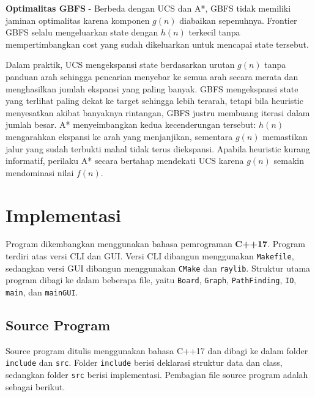 \documentclass[a4paper,11pt]{article}
\begin{document}
\textbf{Optimalitas GBFS} - Berbeda dengan UCS dan A*, GBFS tidak memiliki jaminan optimalitas karena komponen $g(n)$ diabaikan sepenuhnya. Frontier GBFS selalu mengeluarkan state dengan $h(n)$ terkecil tanpa mempertimbangkan cost yang sudah dikeluarkan untuk mencapai state tersebut.

Dalam praktik, UCS mengekspansi state berdasarkan urutan $g(n)$ tanpa panduan arah sehingga pencarian menyebar ke semua arah secara merata dan menghasilkan jumlah ekspansi yang paling banyak. GBFS mengekspansi state yang terlihat paling dekat ke target sehingga lebih terarah, tetapi bila heuristic menyesatkan akibat banyaknya rintangan, GBFS justru membuang iterasi dalam jumlah besar. A* menyeimbangkan kedua kecenderungan tersebut: $h(n)$ mengarahkan ekspansi ke arah yang menjanjikan, sementara $g(n)$ memastikan jalur yang sudah terbukti mahal tidak terus diekspansi. Apabila heuristic kurang informatif, perilaku A* secara bertahap mendekati UCS karena $g(n)$ semakin mendominasi nilai $f(n)$.

\section{Implementasi}
Program dikembangkan menggunakan bahasa pemrograman \textbf{C++17}. Program terdiri atas versi CLI dan GUI. Versi CLI dibangun menggunakan \texttt{Makefile}, sedangkan versi GUI dibangun menggunakan \texttt{CMake} dan \texttt{raylib}. Struktur utama program dibagi ke dalam beberapa file, yaitu \texttt{Board}, \texttt{Graph}, \texttt{PathFinding}, \texttt{IO}, \texttt{main}, dan \texttt{mainGUI}.

\subsection{Source Program}
Source program ditulis menggunakan bahasa C++17 dan dibagi ke dalam folder \texttt{include} dan \texttt{src}. Folder \texttt{include} berisi deklarasi struktur data dan class, sedangkan folder \texttt{src} berisi implementasi. Pembagian file source program adalah sebagai berikut.
\end{document}
